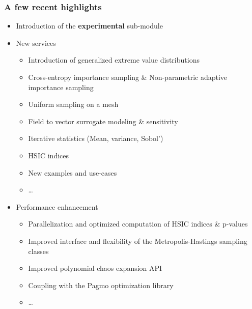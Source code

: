 \documentclass[aspectratio=169]{beamer}
\begin{document}
\begin{frame}
\frametitle{A few recent highlights }

\small

\begin{itemize}
\item Introduction of the \textbf{experimental} sub-module
\item New services
\begin{itemize}
\item Introduction of generalized extreme value distributions
\item Cross-entropy importance sampling \& Non-parametric adaptive importance sampling
\item Uniform sampling on a mesh
\item Field to vector surrogate modeling \& sensitivity
\item Iterative statistics (Mean, variance, Sobol')
\item HSIC indices
\item New examples and use-cases
\item \ldots
\end{itemize}
\item Performance enhancement
\begin{itemize}
\item Parallelization and optimized computation of HSIC indices \& p-values
\item Improved interface and flexibility of the Metropolis-Hastings sampling classes
\item Improved polynomial chaos expansion API
\item Coupling with the Pagmo optimization library
\item \ldots
\end{itemize}
\end{itemize}

\end{frame}
\end{document}
